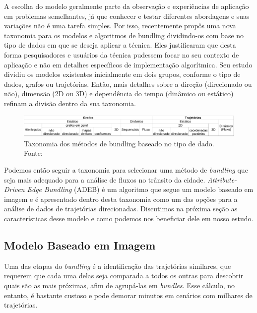   A escolha do modelo geralmente parte da observação e experiências de
aplicação em problemas semelhantes, já que conhecer e testar diferentes
abordagens e suas variações não é uma tarefa simples. Por isso,
\citet{Lhuillier2017} recentemente propôs uma nova taxonomia para os modelos e
algoritmos de bundling dividindo-os com base no tipo de dados em que se deseja
aplicar a técnica. Eles justificaram que desta forma pesquisadores e usuários
da técnica pudessem focar no seu contexto de aplicação e não em detalhes
específicos de implementação algorítmica. Seu estudo dividiu os modelos
existentes inicialmente em dois grupos, conforme o tipo de dados, grafos ou
trajetórias. Então, mais detalhes sobre a direção (direcionado ou não),
dimensão (2D ou 3D) e dependência do tempo (dinâmico ou estático) refinam a
divisão dentro da sua taxonomia.


\begin{figure}[!htb]
  \centering
  \includegraphics[width=\textwidth]{../figuras/estado-da-arte.pdf}
  \caption{Taxonomia dos métodos de bundling baseado no tipo de dado. Fonte: \citet{Lhuillier2017}}
  \label{table:bundling-methods}
\end{figure}


Podemos então seguir a taxonomia para selecionar uma método de
\emph{bundling} que seja mais adequado para a análise de fluxos no trânsito da
cidade. \emph{Attribute-Driven Edge Bundling} (ADEB) é um algoritmo que segue um
modelo baseado em imagem e é apresentado dentro desta taxonomia como um das
opções para a análise de dados de trajetórias direcionadas. Discutimos na
próxima seção as características desse modelo e como podemos nos beneficiar
dele em nosso estudo.

\subsection{Modelo Baseado em Imagem}

  Uma das etapas do \emph{bundling} é a identificação das trajetórias
similares, que requerem que cada uma delas seja comparada a todos os outras
para descobrir quais são as mais próximas, afim de agrupá-las em
\emph{bundles}.  Esse cálculo, no entanto, é bastante custoso e pode demorar
minutos em cenários com milhares de trajetórias.


